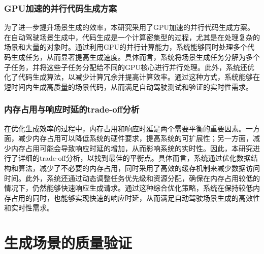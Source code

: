 \documentclass{article}
\begin{document}
\subsubsection{GPU加速的并行代码生成方案}
为了进一步提升场景生成的效率，本研究采用了GPU加速的并行代码生成方案。在自动驾驶场景生成中，代码生成是一个计算密集型的过程，尤其是在处理复杂的场景和大量的对象时。通过利用GPU的并行计算能力，系统能够同时处理多个代码生成任务，从而显著提高生成速度。具体而言，系统将场景生成任务分解为多个子任务，并将这些子任务分配给不同的GPU核心进行并行处理。此外，系统还优化了代码生成算法，以减少计算冗余并提高计算效率。通过这种方式，系统能够在短时间内生成高质量的场景代码，从而满足自动驾驶测试和验证的实时性需求。
\subsubsection{内存占用与响应时延的trade-off分析}
在优化生成效率的过程中，内存占用和响应时延是两个需要平衡的重要因素。一方面，减少内存占用可以降低系统的硬件要求，提高系统的可扩展性；另一方面，减少内存占用可能会导致响应时延的增加，从而影响系统的实时性。因此，本研究进行了详细的trade-off分析，以找到最佳的平衡点。具体而言，系统通过优化数据结构和算法，减少了不必要的内存占用，同时采用了高效的缓存机制来减少数据访问时间。此外，系统还通过动态调整任务优先级和资源分配，确保在内存占用较低的情况下，仍然能够快速响应生成请求。通过这种综合优化策略，系统在保持较低内存占用的同时，也能够实现快速的响应时延，从而满足自动驾驶场景生成的高效性和实时性需求。



\section{生成场景的质量验证}
\end{document}

